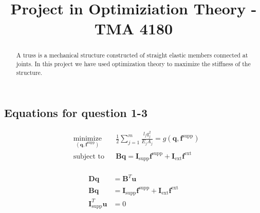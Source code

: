 \documentclass[10pt,a4paper]{article}
\begin{document}
\title{Project in Optimiziation Theory - TMA 4180}
\maketitle

\begin{abstract}
A truss is a mechanical structure constructed of straight elastic members connected at joints. In this project we have used optimization theory to maximize the stiffness of the structure.
\end{abstract}

\subsection*{Equations for question 1-3}

\begin{equation}
 \begin{aligned}
 \label{eq:system5}
 & \underset{(\bm{q},\bm{f}^{\textrm{supp}})}{\text{minimize}}
 & & \frac{1}{2}\sum_{j=1}^{m}\frac{l_{j}q_{j}^{2}}{E_{j}A_{j}} = g(\bm{q},\bm{f}^{\textrm{supp}}) \\
 & \text{subject to}
 & & \bm{Bq} = \bm{I}_{\textrm{supp}}\bm{f}^{\textrm{supp}} + \bm{I}_{\textrm{ext}}\bm{f}^{\textrm{ext}}
 \end{aligned}
\end{equation}
\\
\begin{equation}
\begin{aligned}
\label{eq:system4}
\bm{Dq} &= \bm{B}^{{T}}\bm{u}\\
\bm{Bq} &= \bm{I}_{\textrm{supp}}\bm{f}^{\textrm{supp}} + \bm{I}_{\textrm{ext}}\bm{f}^{\textrm{ext}}\\
\bm{I}_{\textrm{supp}}^{T}\bm{u} &= 0
\end{aligned}
\end{equation}
\end{document}
